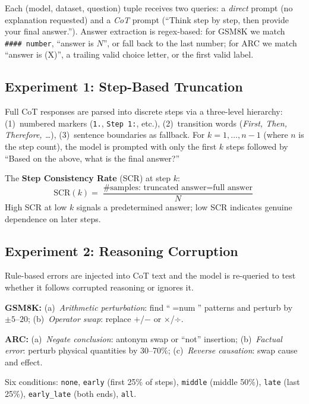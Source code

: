 \documentclass[11pt,twocolumn]{article}
\begin{document}
Each (model, dataset, question) tuple receives two queries: a
\emph{direct} prompt (no explanation requested) and a \emph{CoT} prompt
(``Think step by step, then provide your final answer.'').
Answer extraction is regex-based: for GSM8K we match \texttt{\#\#\#\# number},
``answer is $N$'', or fall back to the last number; for ARC we match ``answer
is (X)'', a trailing valid choice letter, or the first valid label.

\subsection{Experiment 1: Step-Based Truncation}

Full CoT responses are parsed into discrete steps via a three-level hierarchy:
(1)~numbered markers (\texttt{1.}, \texttt{Step 1:}, etc.),
(2)~transition words (\textit{First, Then, Therefore, \ldots}),
(3)~sentence boundaries as fallback.
For $k = 1, \ldots, n{-}1$ (where $n$ is the step count), the model is
prompted with only the first $k$ steps followed by ``Based on the above, what
is the final answer?''

The \textbf{Step Consistency Rate} (SCR) at step $k$:
\begin{equation}
\text{SCR}(k) = \frac{\text{\# samples: truncated answer} = \text{full answer}}{N}
\end{equation}
High SCR at low $k$ signals a predetermined answer; low SCR indicates genuine
dependence on later steps.

\subsection{Experiment 2: Reasoning Corruption}

Rule-based errors are injected into CoT text and the model is re-queried to
test whether it follows corrupted reasoning or ignores it.

\textbf{GSM8K:} (a)~\emph{Arithmetic perturbation}: find ``$= \text{num}$''
patterns and perturb by $\pm 5$--$20$; (b)~\emph{Operator swap}: replace
$+$/$-$ or $\times$/$\div$.

\textbf{ARC:} (a)~\emph{Negate conclusion}: antonym swap or
``not'' insertion; (b)~\emph{Factual error}: perturb physical quantities by
30--70\%; (c)~\emph{Reverse causation}: swap cause and effect.

Six conditions: \texttt{none}, \texttt{early} (first 25\% of steps),
\texttt{middle} (middle 50\%), \texttt{late} (last 25\%), \texttt{early\_late}
(both ends), \texttt{all}.
\end{document}
